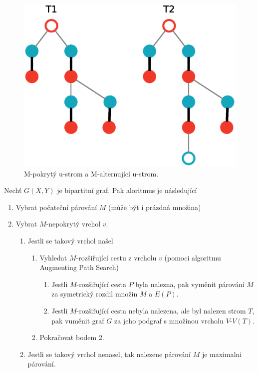 \documentclass[a4paper, 11pt, titlepage, final]{article}[3. prosinec 2011]
\begin{document}
\begin{figure}[ht]
  \centering
  \includegraphics[scale=0.5]{img/trees.eps}
  \caption{M-pokrytý u-strom a M-alternující u-strom.}
  \label{imgTrees}
\end{figure}

Nechť $G(X,Y)$ je bipartitní graf. Pak aloritmus je následující

\begin{enumerate}
\item Vybrat počateční párování $M$ (může být i prázdná množina)
\item Vybrat $M$-nepokrytý vrchol $v$.
	\begin{enumerate}
	\item Jestli se takový vrchol našel 
		\begin{enumerate}
		\item Vyhledat $M$-rozšiřující cestu z vrcholu $v$ (pomoci algoritmu Augmenting Path Search)
			\begin{enumerate}
			\item Jestli $M$-rozšiřující cesta $P$ byla nalezna, pak vyměnit párování $M$ za symetrický rozdil množin $M$ a $E(P)$.
			\item Jestli $M$-rozšiřující cesta nebyla nalezena, ale byl nalezen strom $T$, pak vuměnit graf $G$ za jeho podgraf s množinou vrcholu $V$-$V(T)$.
			\end{enumerate}
		\item Pokračovat bodem 2.
		\end{enumerate}
	\item Jestli se takový vrchol nenasel, tak nalezene párování $M$ je maximalni párování.
	\end{enumerate}
\end{enumerate}
\end{document}
